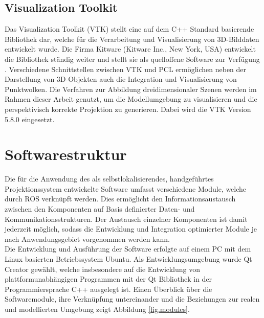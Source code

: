 \subsection{Visualization Toolkit}
\label{chap.vtk}
Das Visualization Toolkit (VTK) stellt eine auf dem C++ Standard basierende Bibliothek dar, welche für die Verarbeitung und Visualisierung von 3D-Bilddaten entwickelt wurde. Die Firma Kitware (Kitware Inc., New York, USA) entwickelt die Bibliothek ständig weiter und stellt sie als quelloffene Software zur Verfügung \cite{VTK}. Verschiedene Schnittstellen zwischen VTK und PCL ermöglichen neben der Darstellung von 3D-Objekten auch die Integration und Visualisierung von Punktwolken. Die Verfahren zur Abbildung dreidimensionaler Szenen werden im Rahmen dieser Arbeit genutzt, um die Modellumgebung zu visualisieren und die perspektivisch korrekte Projektion zu generieren. Dabei wird die VTK Version 5.8.0 eingesetzt.

\prever{
\red[Ausführlicher?\\]
}

\prever{
}
\section{Softwarestruktur}
\label{chap.softwarestruct}
Die für die Anwendung des  als selbstlokalisierendes, handgeführtes Projektionssystem entwickelte Software umfasst verschiedene Module, welche durch ROS verknüpft werden. Dies ermöglicht den Informationsaustausch zwischen den Komponenten auf Basis definierter Daten- und Kommunikationsstrukturen. Der Austausch einzelner Komponenten ist damit jederzeit möglich, sodass die Entwicklung und Integration optimierter Module je nach Anwendungsgebiet vorgenommen werden kann.\\
Die Entwicklung und Ausführung der Software erfolgte auf einem PC mit dem Linux basierten Betriebssystem Ubuntu. Als Entwicklungsumgebung wurde Qt Creator gewählt, welche insbesondere auf die Entwicklung von plattformunabhängigen Programmen mit der Qt Bibliothek in der Programmiersprache C++ ausgelegt ist.
Einen Überblick über die Softwaremodule, ihre Verknüpfung untereinander und die Beziehungen zur realen und modellierten Umgebung zeigt Abbildung \ref{fig.modules}.\\

